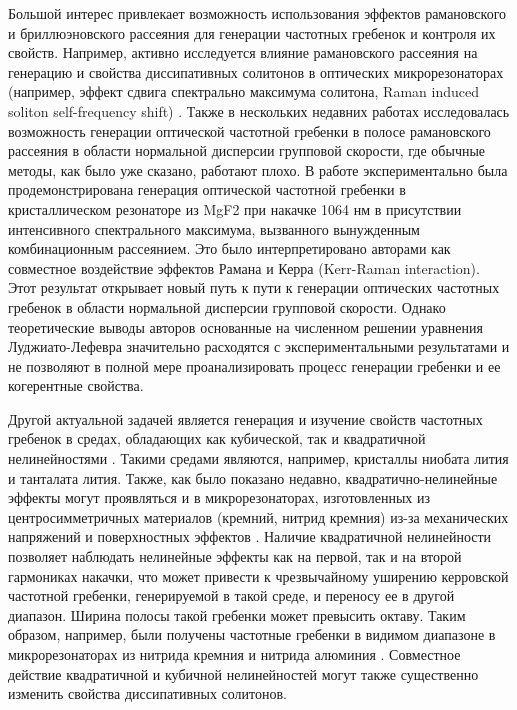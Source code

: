 Большой интерес привлекает возможность использования эффектов рамановского и бриллюэновского рассеяния для генерации частотных гребенок и контроля их свойств. Например, активно исследуется влияние рамановского рассеяния на генерацию и свойства диссипативных солитонов в оптических микрорезонаторах (например, эффект сдвига спектрально максимума солитона, Raman induced soliton self-frequency shift) \cite{Hansson2014ol,Milian2015,Yi2016,Karpov2016,Bao2017}. Также в нескольких недавних работах \cite{Chembo2015,Chembo2016} исследовалась возможность генерации оптической частотной гребенки в полосе рамановского рассеяния в области нормальной дисперсии групповой скорости, где обычные методы, как было уже сказано, работают плохо. В работе \cite{Chembo2015} экспериментально была продемонстрирована генерация оптической частотной гребенки в кристаллическом резонаторе из MgF2 при накачке 1064 нм в присутствии интенсивного спектрального максимума, вызванного вынужденным комбинационным рассеянием. Это было интерпретировано авторами как совместное воздействие эффектов Рамана и Керра (Kerr-Raman interaction). Этот результат открывает новый путь к пути к генерации оптических частотных гребенок в области нормальной дисперсии групповой скорости. Однако теоретические выводы авторов основанные на численном решении уравнения Луджиато-Лефевра значительно расходятся с экспериментальными результатами и не позволяют в полной мере проанализировать процесс генерации гребенки и ее когерентные свойства.


Другой актуальной задачей является генерация и изучение свойств частотных гребенок в средах, обладающих как кубической, так и квадратичной нелинейностями \cite{Strekalov2016}. Такими средами являются, например, кристаллы ниобата лития и танталата лития. Также, как было показано недавно, квадратично-нелинейные эффекты могут проявляться и в микрорезонаторах, изготовленных из центросимметричных материалов (кремний, нитрид кремния) из-за механических напряжений и поверхностных эффектов \cite{Miller2014}. Наличие квадратичной нелинейности позволяет наблюдать нелинейные эффекты как на первой, так и на второй гармониках накачки, что может привести к чрезвычайному уширению керровской частотной гребенки, генерируемой в такой среде, и переносу ее в другой диапазон. Ширина полосы такой гребенки может превысить октаву. Таким образом, например, были получены частотные гребенки в видимом диапазоне в микрорезонаторах из нитрида кремния \cite{Miller2014} и нитрида алюминия \cite{Jung2014}. Совместное действие квадратичной и кубичной нелинейностей могут также существенно изменить свойства диссипативных солитонов.


